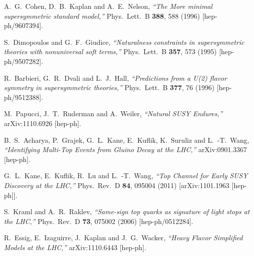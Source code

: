 \begin{thebibliography}{99}
  A.~G.~Cohen, D.~B.~Kaplan and A.~E.~Nelson,
  {\it ``The More minimal supersymmetric standard model,''}
  Phys.\ Lett.\ B {\bf 388}, 588 (1996)
  [hep-ph/9607394].


  S.~Dimopoulos and G.~F.~Giudice,
  {\it ``Naturalness constraints in supersymmetric theories with nonuniversal soft terms,''}
  Phys.\ Lett.\ B {\bf 357}, 573 (1995)
  [hep-ph/9507282].


  R.~Barbieri, G.~R.~Dvali and L.~J.~Hall,
  {\it ``Predictions from a U(2) flavor symmetry in supersymmetric theories,''}
  Phys.\ Lett.\ B {\bf 377}, 76 (1996)
  [hep-ph/9512388].


  M.~Papucci, J.~T.~Ruderman and A.~Weiler,
  {\it ``Natural SUSY Endures,''}
  arXiv:1110.6926 [hep-ph].



  B.~S.~Acharya, P.~Grajek, G.~L.~Kane, E.~Kuflik, K.~Suruliz and L.~-T.~Wang,
  {\it ``Identifying Multi-Top Events from Gluino Decay at the LHC,''}
  arXiv:0901.3367 [hep-ph].

  G.~L.~Kane, E.~Kuflik, R.~Lu and L.~-T.~Wang,
  {\it ``Top Channel for Early SUSY Discovery at the LHC,''}
  Phys.\ Rev.\ D {\bf 84}, 095004 (2011)
  [arXiv:1101.1963 [hep-ph]].


  S.~Kraml and A.~R.~Raklev,
  {\it ``Same-sign top quarks as signature of light stops at the LHC,''}
  Phys.\ Rev.\ D {\bf 73}, 075002 (2006)
  [hep-ph/0512284].



  R.~Essig, E.~Izaguirre, J.~Kaplan and J.~G.~Wacker,
  {\it ``Heavy Flavor Simplified Models at the LHC,''}
  arXiv:1110.6443 [hep-ph].



\end{thebibliography}
